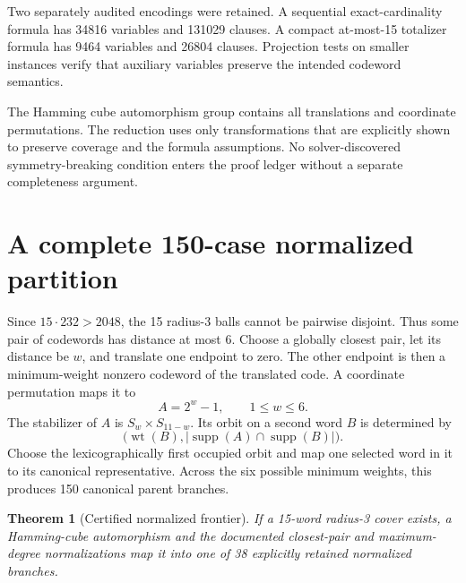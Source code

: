 \documentclass[11pt]{article}
\newtheorem{theorem}{Theorem}
\theoremstyle{definition}
\theoremstyle{remark}
\begin{document}
Two separately audited encodings were retained.  A sequential
exact-cardinality formula has 34816 variables and 131029 clauses.  A
compact at-most-15 totalizer formula has 9464 variables and 26804
clauses.  Projection tests on smaller instances verify that auxiliary
variables preserve the intended codeword semantics.

The Hamming cube automorphism group contains all translations and
coordinate permutations.  The reduction uses only transformations that
are explicitly shown to preserve coverage and the formula assumptions.
No solver-discovered symmetry-breaking condition enters the proof
ledger without a separate completeness argument.

\section{A complete 150-case normalized partition}

Since $15\cdot232>2048$, the 15 radius-3 balls cannot be pairwise
disjoint.  Thus some pair of codewords has distance at most 6.  Choose
a globally closest pair, let its distance be $w$, and translate one
endpoint to zero.  The other endpoint is then a minimum-weight nonzero
codeword of the translated code.  A coordinate permutation maps it to
\[
  A=2^w-1,\qquad 1\leq w\leq6.
\]
The stabilizer of $A$ is $S_w\times S_{11-w}$.  Its orbit on a second
word $B$ is determined by
\[
  \bigl(\operatorname{wt}(B),
        |\operatorname{supp}(A)\cap\operatorname{supp}(B)|\bigr).
\]
Choose the lexicographically first occupied orbit and map one selected
word in it to its canonical representative.  Across the six possible
minimum weights, this produces 150 canonical parent branches.

\begin{theorem}[Certified normalized frontier]
\label{thm:parents}
If a 15-word radius-3 cover exists, a Hamming-cube automorphism and the
documented closest-pair and maximum-degree normalizations map it into
one of 38 explicitly retained normalized branches.
\end{theorem}
\end{document}
